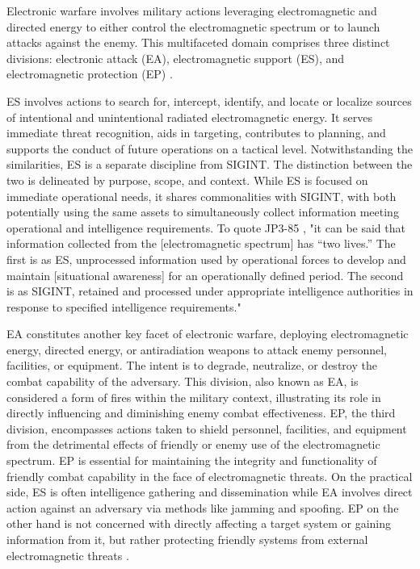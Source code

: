 \documentclass[english, 12pt, a4paper, elec, utf8, a-1b, online]{aaltothesis}
\begin{document}
Electronic warfare involves military actions leveraging electromagnetic and directed energy to either control the electromagnetic spectrum or to launch attacks against the enemy. This multifaceted domain comprises three distinct divisions: electronic attack (EA), electromagnetic support (ES), and electromagnetic protection (EP) \cite{jp3-85,kosola2013digitaalinen}.

ES involves actions to search for, intercept, identify, and locate or localize sources of intentional and unintentional radiated electromagnetic energy. It serves immediate threat recognition, aids in targeting, contributes to planning, and supports the conduct of future operations on a tactical level. Notwithstanding the similarities, ES is a separate discipline from SIGINT. The distinction between the two is delineated by purpose, scope, and context. While ES is focused on immediate operational needs, it shares commonalities with SIGINT, with both potentially using the same assets to simultaneously collect information meeting operational and intelligence requirements.
To quote JP3-85 \cite{jp3-85}, "it can be said that information collected from the [electromagnetic spectrum] has “two lives.”
The first is as ES, unprocessed information used by operational forces to develop and maintain [situational awareness] for an operationally defined period.
The second is as SIGINT, retained and processed under appropriate intelligence authorities in response to specified intelligence requirements." %

EA constitutes another key facet of electronic warfare, deploying electromagnetic energy, directed energy, or antiradiation weapons to attack enemy personnel, facilities, or equipment. The intent is to degrade, neutralize, or destroy the combat capability of the adversary.
This division, also known as EA, is considered a form of fires within the military context, illustrating its role in directly influencing and diminishing enemy combat effectiveness.
EP, the third division, encompasses actions taken to shield personnel, facilities, and equipment from the detrimental effects of friendly or enemy use of the electromagnetic spectrum. EP is essential for maintaining the integrity and functionality of friendly combat capability in the face of electromagnetic threats.
On the practical side, ES is often intelligence gathering and dissemination while EA involves direct action against an adversary via methods like jamming and spoofing.
EP on the other hand is not concerned with directly affecting a target system or gaining information from it, but rather protecting friendly systems from external electromagnetic threats \cite{kosola2013digitaalinen,jp3-85}.
\end{document}
